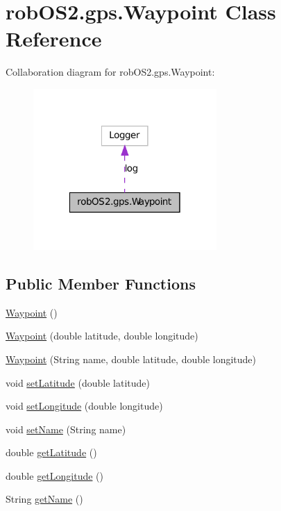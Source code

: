 \hypertarget{classrob_o_s2_1_1gps_1_1_waypoint}{
\section{robOS2.gps.Waypoint Class Reference}
\label{classrob_o_s2_1_1gps_1_1_waypoint}
}


Collaboration diagram for robOS2.gps.Waypoint:\nopagebreak
\begin{figure}[H]
\begin{center}
\leavevmode
\includegraphics[width=198pt]{classrob_o_s2_1_1gps_1_1_waypoint__coll__graph}
\end{center}
\end{figure}
\subsection*{Public Member Functions}
\begin{DoxyCompactItemize}
\item 
\hyperlink{classrob_o_s2_1_1gps_1_1_waypoint_a3e5ed63083dd8507cd2189b90c237558}{Waypoint} ()
\item 
\hyperlink{classrob_o_s2_1_1gps_1_1_waypoint_a57886c38e729261dd103c45bda117cfa}{Waypoint} (double latitude, double longitude)
\item 
\hyperlink{classrob_o_s2_1_1gps_1_1_waypoint_a8e548350c20ce559cacf3998acee8675}{Waypoint} (String name, double latitude, double longitude)
\item 
void \hyperlink{classrob_o_s2_1_1gps_1_1_waypoint_a86ad59f1c03cec1f72c41acce6060e92}{setLatitude} (double latitude)
\item 
void \hyperlink{classrob_o_s2_1_1gps_1_1_waypoint_a5cb38922c7f13563297d9395aae65430}{setLongitude} (double longitude)
\item 
void \hyperlink{classrob_o_s2_1_1gps_1_1_waypoint_ab1defbfaa7d8c02eca311f7daa2df27b}{setName} (String name)
\item 
double \hyperlink{classrob_o_s2_1_1gps_1_1_waypoint_a05e9f5fdcdf284e92aa4abeb827ce407}{getLatitude} ()
\item 
double \hyperlink{classrob_o_s2_1_1gps_1_1_waypoint_a2f218a8a7251cf96d3e769b2eeb98e14}{getLongitude} ()
\item 
String \hyperlink{classrob_o_s2_1_1gps_1_1_waypoint_a7807c267d07f8c0df058e9ee6daba714}{getName} ()
\end{DoxyCompactItemize}

